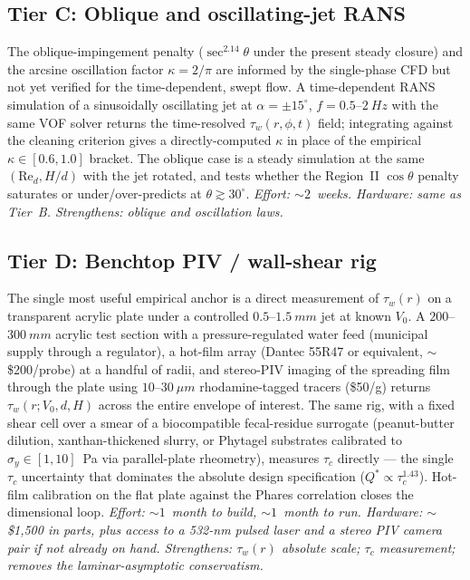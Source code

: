 \documentclass[aps,prfluids,reprint,amsmath,amssymb,floatfix]{revtex4-2}
\newcommand{\Rey}{\mathrm{Re}}
\begin{document}
\subsection*{Tier C: Oblique and oscillating-jet RANS}
The oblique-impingement penalty ($\sec^{2.14}\theta$ under the present steady
closure) and the arcsine oscillation factor $\kappa = 2/\pi$ are informed by
the single-phase CFD but not yet verified for the time-dependent, swept flow.
A time-dependent RANS simulation of a sinusoidally oscillating jet at $\alpha =
\pm 15^\circ$, $f = 0.5$--$\SI{2}{Hz}$ with the same VOF solver
returns the time-resolved $\tau_w(r,\phi,t)$ field; integrating
against the cleaning criterion gives a directly-computed $\kappa$
in place of the empirical $\kappa \in [0.6, 1.0]$ bracket. The
oblique case is a steady simulation at the same $(\Rey_d, H/d)$
with the jet rotated, and tests whether the Region~II $\cos\theta$
penalty saturates or under/over-predicts at $\theta \gtrsim 30^\circ$.
\textit{Effort: $\sim 2$~weeks. Hardware: same as Tier~B.
Strengthens: oblique and oscillation laws.}

\subsection*{Tier D: Benchtop PIV / wall-shear rig}
The single most useful empirical anchor is a direct measurement of
$\tau_w(r)$ on a transparent acrylic plate under a controlled
$0.5$--$\SI{1.5}{mm}$ jet at known $V_0$. A $200$--$\SI{300}{mm}$
acrylic test section with a pressure-regulated water feed
(municipal supply through a regulator), a hot-film array
(Dantec 55R47 or equivalent, $\sim$\$200/probe) at a handful of
radii, and stereo-PIV imaging of the spreading film through the
plate using $10$--$\SI{30}{\mu m}$ rhodamine-tagged tracers
(\$50/g) returns $\tau_w(r;V_0,d,H)$ across the entire envelope of
interest. The same rig, with a fixed shear cell over a smear of a
biocompatible fecal-residue surrogate (peanut-butter dilution,
xanthan-thickened slurry, or Phytagel substrates calibrated to
$\sigma_y \in [1, 10]$~Pa via parallel-plate rheometry), measures
$\tau_c$ directly --- the single $\tau_c$ uncertainty that dominates the
absolute design specification ($Q^* \propto \tau_c^{1.43}$). Hot-film calibration on the
flat plate against the Phares correlation closes the dimensional
loop.
\textit{Effort: $\sim 1$~month to build, $\sim 1$~month to run.
Hardware: $\sim$\$1{,}500 in parts, plus access to a 532-nm pulsed
laser and a stereo PIV camera pair if not already on hand.
Strengthens: $\tau_w(r)$ absolute scale; $\tau_c$ measurement;
removes the laminar-asymptotic conservatism.}
\end{document}
